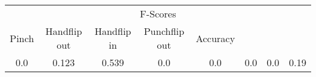\documentclass{standalone}
\begin{document}
 
 \begin{tabular}{|c|c|c|c|c|c|c ||c|}
\cline{1-8}\multicolumn{8}{|c|}{F-Scores} \\ 
\cline{1-8}Pinch & Handflip out & Handflip in & Punchflip out & Accuracy\\ 
\cline{1-8}0.0 & 0.123 & 0.539 & 0.0 & 0.0 & 0.0 & 0.0 & 0.19\\ 
 \cline{1-8}\hline \end{tabular}
 
\end{document}
